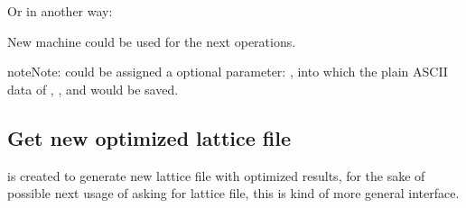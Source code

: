 \documentclass[letterpaper,10pt,english]{sphinxmanual}
\begin{document}
\begin{sphinxVerbatim}[commandchars=\\\{\},formatcom=\scriptsize]
  
\PYG{p}{[}\PYG{p}{]}
\end{sphinxVerbatim}

Or in another way:

\begin{sphinxVerbatim}[commandchars=\\\{\},formatcom=\scriptsize]
  
\end{sphinxVerbatim}

New machine  could be used for the next operations.

\begin{sphinxadmonition}{note}{Note:}
  could be assigned a optional parameter: ,
into which the plain ASCII data of , , and  would
be saved.
\end{sphinxadmonition}


\subsection{Get new optimized lattice file}
\label{\detokenize{src/demos/demo6:get-new-optimized-lattice-file}}
 is created to generate new lattice file with
optimized results, for the sake of possible next usage of asking for
lattice file, this is kind of more general interface.

\begin{sphinxVerbatim}[commandchars=\\\{\},formatcom=\scriptsize]
\end{sphinxVerbatim}
\end{document}
